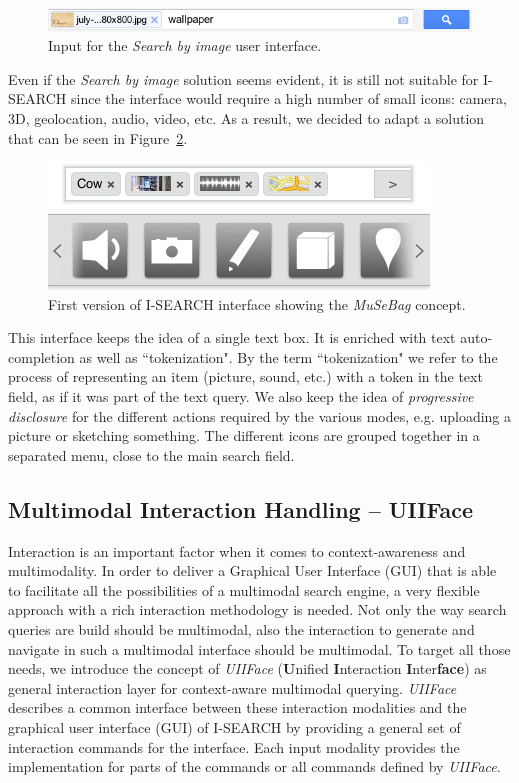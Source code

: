\documentclass[runningheads,a4paper]{llncs} \usepackage[utf8]{inputenc}
\begin{document}
\begin{figure}[h!]
  \centering
    \includegraphics[width=0.7\linewidth]{resources/search-by-image-UI-box.png}
  \caption{Input for the \textit{Search by image} user interface.}
  \label{fig:search-by-image-box}
\end{figure}



Even if the \textit{Search by image} solution seems evident, it is still not suitable for \mbox{I-SEARCH} since the interface would require a high number of small icons: camera, 3D, geolocation, audio, video, etc.  As a result, we decided to adapt a solution that can be seen in Figure~\ref{fig:isearch-ui}.

\begin{figure}[h!]
  \centering
    \includegraphics[width=0.4\linewidth]{resources/isearch-UI-mobile.png}
  \caption{First version of \mbox{I-SEARCH} interface showing the \emph{MuSeBag} concept.}
  \label{fig:isearch-ui}
\end{figure}

This interface keeps the idea of a single text box. It is enriched with text auto-completion as well as ``tokenization". By the term ``tokenization" we refer to the process of representing an item (picture, sound, etc.) with a token in the text field, as if it was part of the text query. We also keep the idea of \emph{progressive disclosure} for the different actions required by the various modes, e.g. uploading a picture or sketching something. The different icons are grouped together in a separated menu, close to the main search field.

\subsection{Multimodal Interaction Handling -- UIIFace}
Interaction is an important factor when it comes to context-awareness and multimodality. In order to deliver a Graphical User Interface (GUI) that is able to facilitate all the possibilities of a multimodal search engine, a very flexible approach with a rich interaction methodology is needed. Not only the way search queries are build should be multimodal, also the interaction to generate and navigate in such a multimodal interface should be multimodal. To target all those needs, we introduce the concept of \emph{UIIFace} (\textbf{U}nified \textbf{I}nteraction \textbf{I}nter\textbf{face}) as general interaction layer for context-aware multimodal querying. \emph{UIIFace} describes a common interface between these interaction modalities and the graphical user interface (GUI) of \mbox{I-SEARCH} by providing a general set of interaction commands for the interface. Each input modality provides the implementation for parts of the commands or all commands defined by \emph{UIIFace}. 
\end{document}
